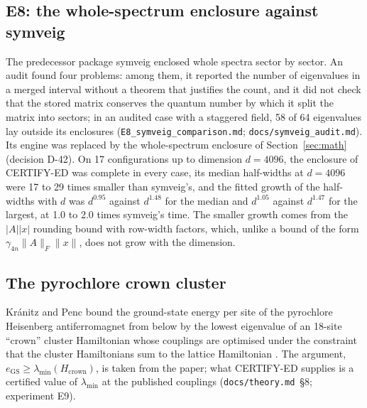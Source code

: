\documentclass[11pt,a4paper]{article}
\newcommand{\code}[1]{\texttt{#1}}
\newcommand{\norm}[1]{\lVert #1\rVert}
\newcommand{\abs}[1]{\lvert #1\rvert}
\begin{document}
\subsection{E8: the whole-spectrum enclosure against symveig}
\label{sec:e8}

The predecessor package symveig \cite{Symveig} enclosed whole spectra sector by sector. An audit found four problems:
among them, it reported the number of eigenvalues in a merged interval without a theorem that justifies the count, and
it did not check that the stored matrix conserves the quantum number by which it split the matrix into sectors; in an
audited case with a staggered field, 58 of 64 eigenvalues lay outside its enclosures (\code{E8\_symveig\_comparison.md};
\code{docs/symveig\_audit.md}). Its engine was replaced by the whole-spectrum enclosure of Section~\ref{sec:math}
(decision D-42). On 17 configurations up to dimension $d=4096$, the enclosure of CERTIFY-ED was complete in every
case, its median half-widths at $d=4096$ were 17 to 29 times smaller than symveig's, and the fitted growth of the
half-widths with $d$ was $d^{0.95}$ against $d^{1.48}$ for the median and $d^{1.05}$ against $d^{1.47}$ for the
largest, at 1.0 to 2.0 times symveig's time. The smaller growth comes from the $\abs{A}\abs{x}$ rounding bound with
row-width factors, which, unlike a bound of the form $\gamma_{4n}\norm{A}_F\norm{x}$, does not grow with the
dimension.

\subsection{The pyrochlore crown cluster}
\label{sec:crown}

Kr\'anitz and Penc bound the ground-state energy per site of the pyrochlore Heisenberg antiferromagnet from below by
the lowest eigenvalue of an 18-site ``crown'' cluster Hamiltonian whose couplings are optimised under the constraint
that the cluster Hamiltonians sum to the lattice Hamiltonian \cite{KranitzPenc2026}. The argument, $e_{\mathrm{GS}}\ge
\lambda_{\min}(H_{\mathrm{crown}})$, is taken from the paper; what CERTIFY-ED supplies is a certified value of
$\lambda_{\min}$ at the published couplings (\code{docs/theory.md}~\S8; experiment E9).
\end{document}
